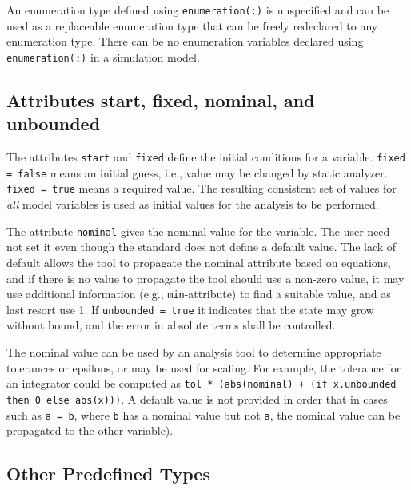 An enumeration type defined using \lstinline!enumeration(:)! is unspecified and can be used as a replaceable enumeration type that can be freely redeclared to any enumeration type.
There can be no enumeration variables declared using \lstinline!enumeration(:)! in a simulation model.


\subsection{Attributes start, fixed, nominal, and unbounded}\label{attributes-start-fixed-nominal-and-unbounded}

The attributes \lstinline!start! and \lstinline!fixed! define the initial conditions for a variable.
\lstinline!fixed = false! means an initial guess, i.e., value may be changed by static analyzer.
\lstinline!fixed = true! means a required value.
The resulting consistent set of values for \emph{all} model variables is used as initial values for the analysis to be performed.

The attribute \lstinline!nominal! gives the nominal value for the variable.
The user need not set it even though the standard does not define a default value.
The lack of default allows the tool to propagate the nominal attribute based on equations, and if there is no value to propagate the tool should use a non-zero value, it may use additional information (e.g., \lstinline!min!-attribute) to find a suitable value, and as last resort use 1.
If \lstinline!unbounded = true! it indicates that the state may grow without bound, and the error in absolute terms shall be controlled.

\begin{nonnormative}
The nominal value can be used by an analysis tool to determine appropriate tolerances or epsilons, or may be used for scaling.
For example, the tolerance for an integrator could be computed as \lstinline!tol * (abs(nominal) + (if x.unbounded then 0 else abs(x)))!.
A default value is not provided in order that in cases such as \lstinline!a = b!, where \lstinline!b! has a nominal value but not \lstinline!a!, the nominal value can be propagated to the other variable).
\end{nonnormative}


\subsection{Other Predefined Types}\label{other-predefined-types}

